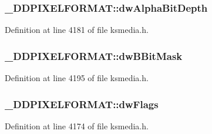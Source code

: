 \subsubsection[{\texorpdfstring{dw\+Alpha\+Bit\+Depth}{dwAlphaBitDepth}}]{ \+\_\+\+D\+D\+P\+I\+X\+E\+L\+F\+O\+R\+M\+A\+T\+::dw\+Alpha\+Bit\+Depth}\hypertarget{struct___d_d_p_i_x_e_l_f_o_r_m_a_t_a611f8b7134eb953e9ddb432510a4d3fa}{}\label{struct___d_d_p_i_x_e_l_f_o_r_m_a_t_a611f8b7134eb953e9ddb432510a4d3fa}


Definition at line 4181 of file ksmedia.\+h.

\subsubsection[{\texorpdfstring{dw\+B\+Bit\+Mask}{dwBBitMask}}]{ \+\_\+\+D\+D\+P\+I\+X\+E\+L\+F\+O\+R\+M\+A\+T\+::dw\+B\+Bit\+Mask}\hypertarget{struct___d_d_p_i_x_e_l_f_o_r_m_a_t_a1e796c93bdf1ffdce92bec05181607f5}{}\label{struct___d_d_p_i_x_e_l_f_o_r_m_a_t_a1e796c93bdf1ffdce92bec05181607f5}


Definition at line 4195 of file ksmedia.\+h.

\subsubsection[{\texorpdfstring{dw\+Flags}{dwFlags}}]{ \+\_\+\+D\+D\+P\+I\+X\+E\+L\+F\+O\+R\+M\+A\+T\+::dw\+Flags}\hypertarget{struct___d_d_p_i_x_e_l_f_o_r_m_a_t_ad26631effea4a5e7591bfd74166f9378}{}\label{struct___d_d_p_i_x_e_l_f_o_r_m_a_t_ad26631effea4a5e7591bfd74166f9378}


Definition at line 4174 of file ksmedia.\+h.

